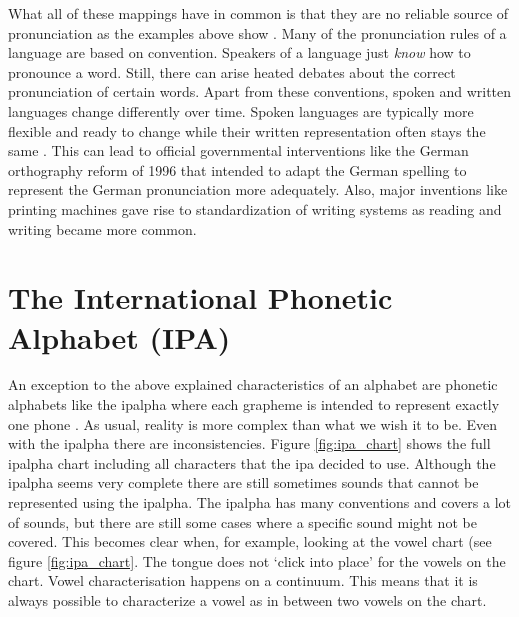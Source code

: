 What all of these mappings have in common is that they are no reliable source of pronunciation as the examples above show \citep{Intro.2007}. Many of the pronunciation rules of a language are based on convention. Speakers of a language just \textit{know} how to pronounce a word. Still, there can arise heated debates about the correct pronunciation of certain words.  Apart from these conventions, spoken and written languages change differently over time. Spoken languages are typically more flexible and ready to change while their written representation often stays the same \citep{unicode-lingu}. This can lead to official governmental interventions like the German orthography reform of 1996 that intended to adapt the German spelling to represent the German pronunciation more adequately. Also, major inventions like printing machines gave rise to standardization of writing systems as reading and writing became more common.

\section{The International Phonetic Alphabet (IPA)}
\label{sec:ipa}
An exception to the above explained characteristics of an alphabet are phonetic alphabets like the \ac{ipalpha} where each grapheme is intended to represent exactly one phone  \citep{writing-systems, Intro.2007}. As usual, reality is more complex than what we wish it to be. Even with the \ac{ipalpha} there are inconsistencies. Figure \ref{fig:ipa_chart} shows the full \ac{ipalpha} chart including all characters that the \ac{ipa} decided to use. Although the \ac{ipalpha} seems very complete there are still sometimes sounds that cannot be represented using the \ac{ipalpha}. The \ac{ipalpha} has many conventions and covers a lot of sounds, but there are still some cases where a specific sound might not be covered. This becomes clear when, for example, looking at the vowel chart (see figure \ref{fig:ipa_chart}. The tongue does not `click into place' for the vowels on the chart. Vowel characterisation happens on a continuum. This means that it is always possible to characterize a vowel as in between two vowels on the chart.
  
